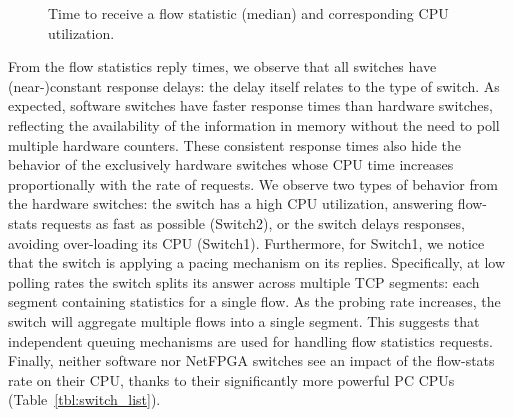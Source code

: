 \begin{figure}[h]
  \begin{center}
  \end{center}
  \caption{Time to receive a flow statistic (median) and corresponding CPU utilization.}
  \label{fig:stat_request}
\end{figure}

From the flow statistics reply times, we observe that all switches have
(near-)constant response delays: the delay itself relates to the type of switch.
As expected, software switches have faster response times than hardware
switches, reflecting the availability of the information in memory without the
need to poll multiple hardware counters. These consistent response times also
hide the behavior of the exclusively hardware switches whose CPU time increases
proportionally with the rate of requests.  We observe two types of behavior from
the hardware switches: the switch has a high CPU utilization, answering
flow-stats requests as fast as possible (Switch2), or the switch delays
responses, avoiding over-loading its CPU (Switch1). Furthermore, for Switch1, we
notice that the switch is applying a pacing mechanism on its replies.
Specifically, at low polling rates the switch splits its answer across multiple
TCP segments: each segment containing statistics for a single flow.  As the
probing rate increases, the switch will aggregate multiple flows into a single
segment. This suggests that independent queuing mechanisms are used for handling
flow statistics requests. Finally, neither software nor NetFPGA switches see an
impact of the flow-stats rate on their CPU, thanks to their significantly more
powerful PC CPUs (Table~\ref{tbl:switch_list}).

